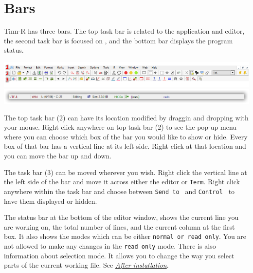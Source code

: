 
\section{Bars}

Tinn-R has three bars. The top task bar is related to the application and editor,
the second task bar is focused on \RR{}, and the bottom bar displays the program status.

\includegraphics[scale=0.50]{./res/parts_02.png} \\
\includegraphics[scale=0.50]{./res/status_bar.png}

The top task bar (2) can have its location modified by draggin and dropping with your mouse.
Right click anywhere on top task bar (2) to see the pop-up menu where you can choose which box
of the bar you would like to show or hide. Every box of that bar has a vertical line at its left side.
Right click at that location and you can move the bar up and down.

The \RR{} task bar (3) can be moved wherever you wish. Right click the vertical line at the left side of the
bar and move it across either the editor or \texttt{Term}. Right click anywhere within the \RR{} task bar and choose between
\texttt{Send to \RR{}} and \texttt{Control \RR{}} to have them displayed or hidden.

The status bar at the bottom of the editor window, shows the current line you are working on,
the total number of lines, and the current column at the first box.
It also shows the modes which can be either \texttt{normal or read only}.
You are not allowed to make any changes in the \texttt{read only} mode.
There is also information about selection mode. It allows you to change the way you select parts of the current working file.
See \textit{\href{\#secrets\_after\_installation}{After installation}}.
